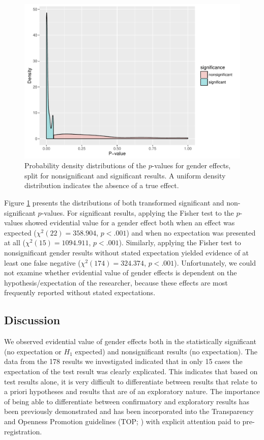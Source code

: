 \documentclass{article}
\begin{document}
\begin{figure}
\begin{center}
\includegraphics{../figures/Fig6.pdf}
\end{center}
\caption{Probability density distributions of the $p$-values for gender effects, split for nonsignificant and significant results. A uniform density distribution indicates the absence of a true effect.}
\label{fig:fig6}
\end{figure}

Figure \ref{fig:fig6} presents the distributions of both transformed significant and non-significant $p$-values. For significant results, applying the Fisher test to the $p$-values showed evidential value for a gender effect both when an effect was expected ($\chi^2(22)=358.904$, $p<.001$) and when no expectation was presented at all ($\chi^2(15)=1094.911$, $p<.001$). Similarly, applying the Fisher test to nonsignificant gender results without stated expectation yielded evidence of at least one false negative ($\chi^2(174)=324.374$, $p<.001$). Unfortunately, we could not examine whether evidential value of gender effects is dependent on the hypothesis/expectation of the researcher, because these effects are most frequently reported without stated expectations. 

\subsection*{Discussion}

We observed evidential value of gender effects both in the statistically significant (no expectation or $H_1$ expected) and nonsignificant results (no expectation). The data from the 178 results we investigated indicated that in only 15 cases the expectation of the test result was clearly explicated. This indicates that based on test results alone, it is very difficult to differentiate between results that relate to a priori hypotheses and results that are of an exploratory nature. The importance of being able to differentiate between confirmatory and exploratory results has been previously demonstrated \cite{Wagenmakers2012-jq} and has been incorporated into the Transparency and Openness Promotion guidelines (TOP; \cite{Nosek2015-nr}) with explicit attention paid to pre-registration.
\end{document}
